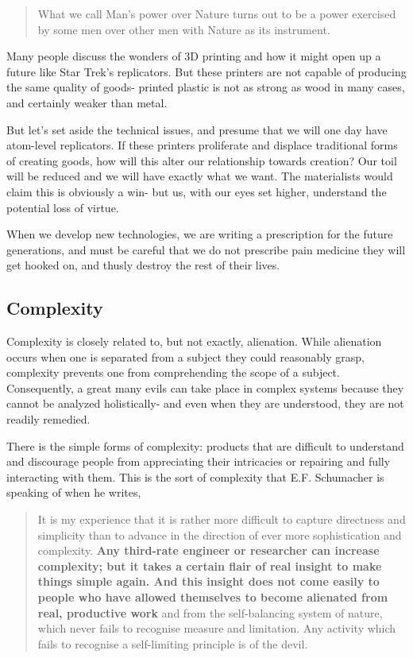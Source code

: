 \documentclass[letterpaper]{article}
\begin{document}
\begin{quote}
  What we call Man's power over Nature turns out to be a power exercised by some men over other men with Nature as its instrument.
\end{quote}

Many people discuss the wonders of 3D printing and how it might open up a future like Star Trek's replicators. But these printers are not capable of producing the same quality of goods- printed plastic is not as strong as wood in many cases, and certainly weaker than metal.

But let's set aside the technical issues, and presume that we will one day have atom-level replicators. If these printers proliferate and displace traditional forms of creating goods, how will this alter our relationship towards creation? Our toil will be reduced and we will have exactly what we want. The materialists would claim this is obviously a win- but us, with our eyes set higher, understand the potential loss of virtue.

When we develop new technologies, we are writing a prescription for the future generations, and must be careful that we do not prescribe pain medicine they will get hooked on, and thusly destroy the rest of their lives.

\subsection{Complexity}

Complexity is closely related to, but not exactly, alienation. While alienation occurs when one is separated from a subject they could reasonably grasp, complexity prevents one from comprehending the scope of a subject. Consequently, a great many evils can take place in complex systems because they cannot be analyzed holistically- and even when they are understood, they are not readily remedied.

There is the simple forms of complexity: products that are difficult to understand and discourage people from appreciating their intricacies or repairing and fully interacting with them. This is the sort of complexity that E.F. Schumacher is speaking of when he writes,

\begin{quote}
  It is my experience that it is rather more difficult to capture directness and simplicity than to advance in the direction of ever more sophistication and complexity. \textbf{Any third-rate engineer or researcher can increase complexity; but it takes a certain flair of real insight to make things simple again. And this insight does not come easily to people who have allowed themselves to become alienated from real, productive work} and from the self-balancing system of nature, which never fails to recognise measure and limitation. Any activity which fails to recognise a self-limiting principle is of the devil.
\end{quote}
\end{document}
